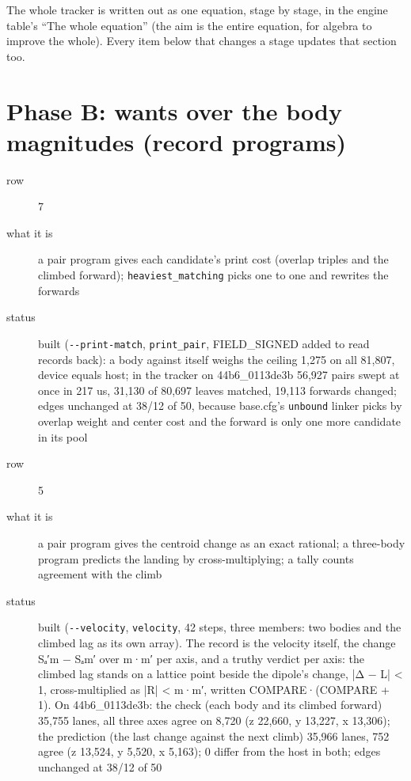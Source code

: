 The whole tracker is written out as one equation, stage by stage, in the engine table's “The whole equation” (the aim is the entire equation, for algebra to improve the whole). Every item below that changes a stage updates that section too.

\section{\texorpdfstring{Phase B: wants over the body magnitudes (record programs)}{Phase B: wants over the body magnitudes (record programs)}}

\begin{description}
\item[{row}] 7
\item[{what it is}] a pair program gives each candidate's print cost (overlap triples and the climbed forward); \texttt{heaviest\_\allowbreak{}matching} picks one to one and rewrites the forwards
\item[{status}] built (\texttt{-\allowbreak{}-\allowbreak{}print-\allowbreak{}match}, \texttt{print\_\allowbreak{}pair}, FIELD\_\allowbreak{}SIGNED added to read records back): a body against itself weighs the ceiling 1,275 on all 81,807, device equals host; in the tracker on 44b6\_\allowbreak{}0113de3b 56,927 pairs swept at once in 217 us, 31,130 of 80,697 leaves matched, 19,113 forwards changed; edges unchanged at 38/12 of 50, because base.cfg's \texttt{unbound} linker picks by overlap weight and center cost and the forward is only one more candidate in its pool
\end{description}

\begin{description}
\item[{row}] 5
\item[{what it is}] a pair program gives the centroid change as an exact rational; a three-body program predicts the landing by cross-multiplying; a tally counts agreement with the climb
\item[{status}] built (\texttt{-\allowbreak{}-\allowbreak{}velocity}, \texttt{velocity}, 42 steps, three members: two bodies and the climbed lag as its own array). The record is the velocity itself, the change Sₐ′m − Sₐm′ over m·m′ per axis, and a truthy verdict per axis: the climbed lag stands on a lattice point beside the dipole's change, |Δ − L| < 1, cross-multiplied as |R| < m·m′, written COMPARE·(COMPARE + 1). On 44b6\_\allowbreak{}0113de3b: the check (each body and its climbed forward) 35,755 lanes, all three axes agree on 8,720 (z 22,660, y 13,227, x 13,306); the prediction (the last change against the next climb) 35,966 lanes, 752 agree (z 13,524, y 5,520, x 5,163); 0 differ from the host in both; edges unchanged at 38/12 of 50
\end{description}

